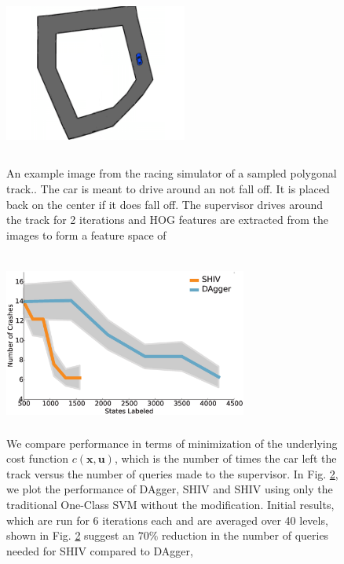 \documentclass[10pt, conference]{ieeeconf}      %
\newcommand{\bu}{\mathbf{u}}
\newcommand{\bx}{\mathbf{x}}
\begin{document}
\begin{figure}[t!]
\centering
\includegraphics[width=6cm, height=6cm]{figures/race_car.png}
\caption{ An example image from the racing simulator of a sampled polygonal track.. The car is meant to drive around an not fall off. It is placed back on the center if it does fall off. The supervisor drives around the track for 2 iterations and HOG features are extracted from the images to form a feature space of }

\vspace*{-10pt}
\label{fig:race_car}
\end{figure}


\begin{figure}[t!]
\centering
\includegraphics[width=8cm, height=6cm]{figures/dagger_shiv_one_class.eps}
\caption{We compare performance in terms of minimization of the underlying cost function $c(\bx,\bu)$, which is the  number of times the car left the track versus the number of queries made to the supervisor. In Fig. \ref{fig:car_cost}, we plot the performance of DAgger, SHIV and SHIV using only the traditional One-Class SVM without the modification.  Initial results, which are run for 6 iterations each and are averaged over 40 levels, shown in Fig. \ref{fig:car_cost} suggest an $70\%$ reduction in the number of queries needed for SHIV compared to DAgger,}
\vspace*{-10pt}
\label{fig:car_cost}
\end{figure}
\end{document}
